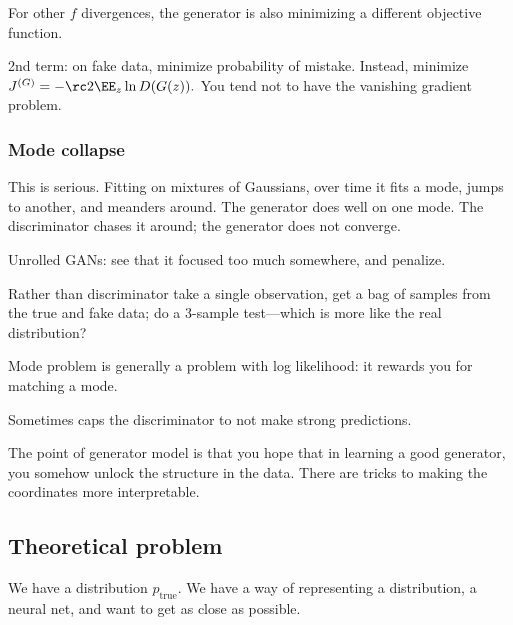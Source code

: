 For other $f$ divergences, the generator is also minimizing a different objective function. %
 
2nd term: on fake data, minimize probability of mistake. Instead, minimize
$J^{(G)} = -\rc2 \EE_{z}\ln D(G(z)).$
You tend not to have the vanishing gradient problem.

\subsubsection{Mode collapse}

This is serious. Fitting on mixtures of Gaussians, over time it fits a mode, jumps to another, and meanders around. The generator does well on one mode. The discriminator chases it around; the generator does not converge.

Unrolled GANs: see that it focused too much somewhere, and penalize. 

Rather than discriminator take a single observation, get a bag of samples from the true and fake data; do a 3-sample test---which is more like the real distribution?



Mode problem is generally a problem with log likelihood: it rewards you for matching a mode.

 Sometimes caps the discriminator to not make strong predictions.                                                                         



The point of generator model is that you hope that in learning a good generator, you somehow unlock the structure in the data. There are tricks to making the coordinates more interpretable.

\subsection{Theoretical problem}

 
We have a distribution $p_{\text{true}}$. We have a way of representing a distribution, a neural net, and want to get as close as possible.

